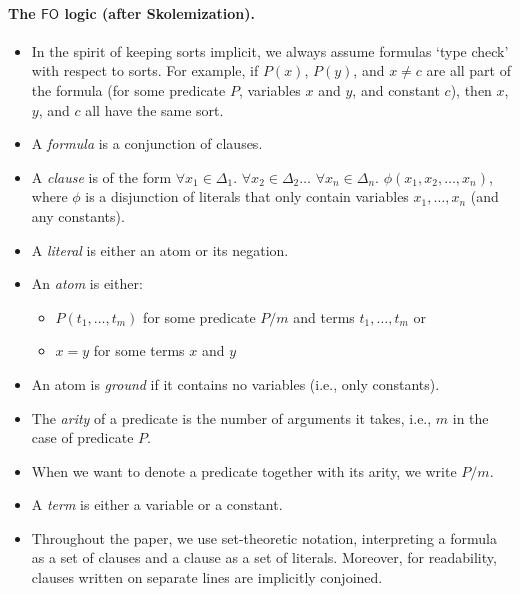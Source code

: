 \documentclass{article}
\theoremstyle{definition}
\newcommand{\FO}{$\mathsf{FO}$}
\begin{document}

\paragraph{The \FO{} logic (after Skolemization).}
\begin{itemize}
  \item In the spirit of keeping sorts implicit, we always assume formulas `type
        check' with respect to sorts. For example, if $P(x)$, $P(y)$, and
        $x \ne c$ are all part of the formula (for some predicate $P$, variables
        $x$ and $y$, and constant $c$), then $x$, $y$, and $c$ all have the same
        sort.
  \item A \emph{formula} is a conjunction of clauses.
  \item A \emph{clause} is of the form $\forall x_{1} \in \Delta_{1}\text{.
        }\forall x_{2} \in \Delta_{2}\dots\text{
        }\forall x_{n} \in \Delta_{n}\text{. }\phi(x_{1}, x_{2}, \dots, x_{n})$,
        where $\phi$ is a disjunction of literals that only contain variables
        $x_{1}, \dots, x_{n}$ (and any constants).
  \item A \emph{literal} is either an atom or its negation.
  \item An \emph{atom} is either:
  \begin{itemize}
    \item $P(t_{1}, \dots, t_{m})$ for some predicate $P/m$ and terms
          $t_{1}, \dots, t_{m}$ or
    \item $x=y$ for some terms $x$ and $y$
  \end{itemize}
  \item An atom is \emph{ground} if it contains no variables (i.e., only
        constants).
  \item The \emph{arity} of a predicate is the number of arguments it takes,
        i.e., $m$ in the case of predicate $P$.
  \item When we want to denote a predicate together with its arity, we write
        $P/m$.
  \item A \emph{term} is either a variable or a constant.
  \item Throughout the paper, we use set-theoretic notation, interpreting a
        formula as a set of clauses and a clause as a set of literals. Moreover,
        for readability, clauses written on separate lines are implicitly
        conjoined.
\end{itemize}
\end{document}
